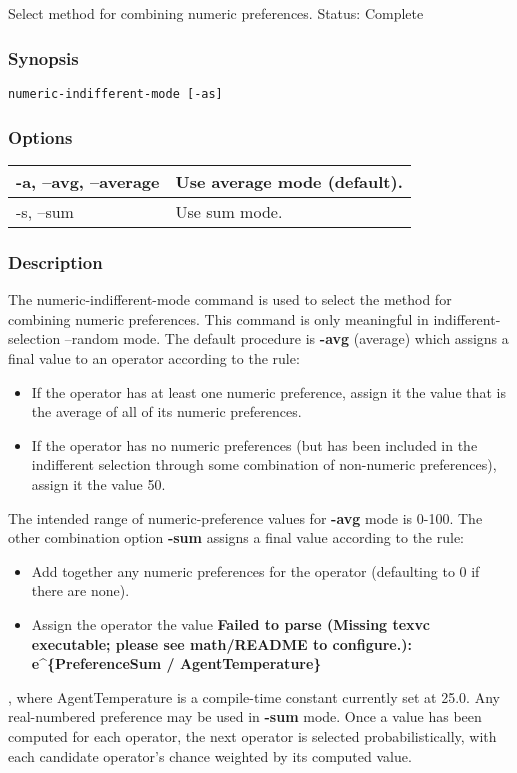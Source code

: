 \subsection{}
\label{numeric-indifferent-mode}
Select method for combining numeric preferences. 
 Status: Complete
\subsubsection*{Synopsis}
\begin{verbatim}
numeric-indifferent-mode [-as]
\end{verbatim}
\subsubsection*{Options}
\begin{tabular}{|l|l|}
\hline 
 -a, --avg, --average  & Use average mode (default).  \\
 \hline 
 -s, --sum  & Use sum mode.  \\
 \hline 
\end{tabular}
\subsubsection*{Description}
 The numeric-indifferent-mode command is used to select the method for combining numeric preferences. This command is only meaningful in indifferent-selection --random  mode. 
 The default procedure is \textbf{-avg}
 (average) which assigns a final value to an operator according to the rule: \begin{itemize}
\item  If the operator has at least one numeric preference, assign it the value that is the average of all of its numeric preferences. 
\item  If the operator has no numeric preferences (but has been included in the indifferent selection through some combination of non-numeric preferences), assign it the value 50. 
\end{itemize}
 The intended range of numeric-preference values for \textbf{-avg}
 mode is 0-100. 
 The other combination option \textbf{-sum}
 assigns a final value according to the rule: \begin{itemize}
\item  Add together any numeric preferences for the operator (defaulting to 0 if there are none). 
\item  Assign the operator the value \textbf{Failed to parse (Missing texvc executable; please see math/README to configure.): e\^{}\{PreferenceSum / AgentTemperature\}}
\end{itemize}
 , where AgentTemperature is a compile-time constant currently set at 25.0. 
 Any real-numbered preference may be used in \textbf{-sum}
 mode. 
 Once a value has been computed for each operator, the next operator is selected probabilistically, with each candidate operator's chance weighted by its computed value. 
